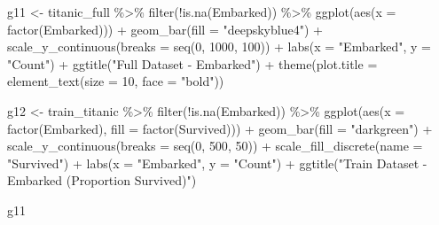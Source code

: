 \documentclass[
]{article}
\newenvironment{Shaded}{\begin{snugshade}}{\end{snugshade}}
\newcommand{\AttributeTok}[1]{\textcolor[rgb]{0.77,0.63,0.00}{#1}}
\newcommand{\DecValTok}[1]{\textcolor[rgb]{0.00,0.00,0.81}{#1}}
\newcommand{\FunctionTok}[1]{\textcolor[rgb]{0.00,0.00,0.00}{#1}}
\newcommand{\NormalTok}[1]{#1}
\newcommand{\OtherTok}[1]{\textcolor[rgb]{0.56,0.35,0.01}{#1}}
\newcommand{\SpecialCharTok}[1]{\textcolor[rgb]{0.00,0.00,0.00}{#1}}
\newcommand{\StringTok}[1]{\textcolor[rgb]{0.31,0.60,0.02}{#1}}
\begin{document}
\begin{Shaded}
\begin{Highlighting}[]
\NormalTok{g11 }\OtherTok{\textless{}{-}}\NormalTok{ titanic\_full }\SpecialCharTok{\%\textgreater{}\%}
  \FunctionTok{filter}\NormalTok{(}\SpecialCharTok{!}\FunctionTok{is.na}\NormalTok{(Embarked)) }\SpecialCharTok{\%\textgreater{}\%}
\FunctionTok{ggplot}\NormalTok{(}\FunctionTok{aes}\NormalTok{(}\AttributeTok{x =} \FunctionTok{factor}\NormalTok{(Embarked))) }\SpecialCharTok{+} 
  \FunctionTok{geom\_bar}\NormalTok{(}\AttributeTok{fill =} \StringTok{"deepskyblue4"}\NormalTok{) }\SpecialCharTok{+} 
  \FunctionTok{scale\_y\_continuous}\NormalTok{(}\AttributeTok{breaks =} \FunctionTok{seq}\NormalTok{(}\DecValTok{0}\NormalTok{, }\DecValTok{1000}\NormalTok{, }\DecValTok{100}\NormalTok{)) }\SpecialCharTok{+} 
  \FunctionTok{labs}\NormalTok{(}\AttributeTok{x =} \StringTok{"Embarked"}\NormalTok{, }\AttributeTok{y =} \StringTok{"Count"}\NormalTok{) }\SpecialCharTok{+} 
  \FunctionTok{ggtitle}\NormalTok{(}\StringTok{"Full Dataset {-} Embarked"}\NormalTok{) }\SpecialCharTok{+}
  \FunctionTok{theme}\NormalTok{(}\AttributeTok{plot.title =} \FunctionTok{element\_text}\NormalTok{(}\AttributeTok{size =} \DecValTok{10}\NormalTok{, }\AttributeTok{face =} \StringTok{"bold"}\NormalTok{))}


\NormalTok{g12 }\OtherTok{\textless{}{-}}\NormalTok{ train\_titanic }\SpecialCharTok{\%\textgreater{}\%}
  \FunctionTok{filter}\NormalTok{(}\SpecialCharTok{!}\FunctionTok{is.na}\NormalTok{(Embarked)) }\SpecialCharTok{\%\textgreater{}\%}
\FunctionTok{ggplot}\NormalTok{(}\FunctionTok{aes}\NormalTok{(}\AttributeTok{x =} \FunctionTok{factor}\NormalTok{(Embarked), }\AttributeTok{fill =} \FunctionTok{factor}\NormalTok{(Survived))) }\SpecialCharTok{+} 
  \FunctionTok{geom\_bar}\NormalTok{(}\AttributeTok{fill =} \StringTok{"darkgreen"}\NormalTok{) }\SpecialCharTok{+} 
  \FunctionTok{scale\_y\_continuous}\NormalTok{(}\AttributeTok{breaks =} \FunctionTok{seq}\NormalTok{(}\DecValTok{0}\NormalTok{, }\DecValTok{500}\NormalTok{, }\DecValTok{50}\NormalTok{)) }\SpecialCharTok{+} 
  \FunctionTok{scale\_fill\_discrete}\NormalTok{(}\AttributeTok{name =} \StringTok{"Survived"}\NormalTok{) }\SpecialCharTok{+}
  \FunctionTok{labs}\NormalTok{(}\AttributeTok{x =} \StringTok{"Embarked"}\NormalTok{, }\AttributeTok{y =} \StringTok{"Count"}\NormalTok{) }\SpecialCharTok{+} 
  \FunctionTok{ggtitle}\NormalTok{(}\StringTok{"Train Dataset {-} Embarked (Proportion Survived)"}\NormalTok{) }

\NormalTok{g11}
\end{Highlighting}
\end{Shaded}
\end{document}
